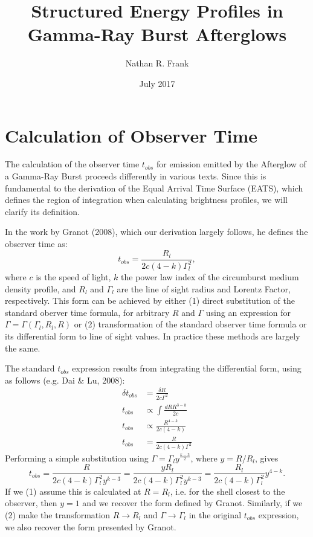\documentclass[11pt,twoside,letterpaper]{report}
\begin{document}
\title{Structured Energy Profiles in Gamma-Ray Burst Afterglows}
\author{Nathan R. Frank}
\date{July 2017}
\maketitle

\section{Calculation of Observer Time}
The calculation of the observer time $t_{obs}$ for emission emitted by the Afterglow of a Gamma-Ray Burst proceeds differently in various texts.  Since this is fundamental to the derivation of the Equal Arrival Time Surface (EATS), which defines the region of integration when calculating brightness profiles, we will clarify its definition.

In the work by Granot (2008), which our derivation largely follows, he defines the observer time as:
\begin{equation}
t_{obs} = \frac{R_l}{2c(4-k)\Gamma_l^2},
\end{equation}
where $c$ is the speed of light, $k$ the power law index of the circumburst medium density profile, and $R_l$ and $\Gamma_l$ are the line of sight radius and Lorentz Factor, respectively. This form can be achieved by either (1) direct substitution of the standard oberver time formula, for arbitrary $R$ and $\Gamma$ using an expression for $\Gamma = \Gamma(\Gamma_l, R_l, R)$ or (2) transformation of the standard observer time formula or its differential form to line of sight values. In practice these methods are largely the same.

The standard $t_{obs}$ expression results from integrating the differential form, using  as follows (e.g. Dai \& Lu, 2008):
\begin{align}
\delta t_{obs} &= \frac{\delta R}{2c\Gamma^2} \\
t_{obs} &\propto \int \frac{dR R^{3-k}}{2c} \\
t_{obs} &\propto \frac{R^{4-k}}{2c(4-k)} \\
t_{obs} &= \frac{R}{2c(4-k)\Gamma^2}
\end{align}
Performing a simple substitution using $\Gamma = \Gamma_l y^{\frac{k-3}{2}}$, where $y = R/R_l$, gives
\begin{equation}
t_{obs} = \frac{R}{2c(4-k)\Gamma_l^2y^{k-3}} = \frac{yR_l}{2c(4-k)\Gamma_l^2y^{k-3}} = \frac{R_l}{2c(4-k)\Gamma_l^2}y^{4-k}.
\end{equation}
If we (1) assume this is calculated at $R=R_l$, i.e. for the shell closest to the observer, then $y=1$ and we recover the form defined by Granot. Similarly, if we (2) make the transformation $R \rightarrow R_l$ and $\Gamma \rightarrow \Gamma_l$ in the original $t_{obs}$ expression, we also recover the form presented by Granot.
\end{document}
